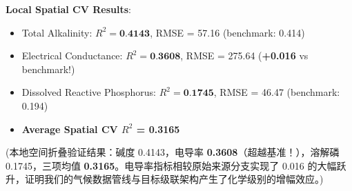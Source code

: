 \begin{infobox}
\textbf{Local Spatial CV Results}:
\begin{itemize}
    \item Total Alkalinity: $R^2 = \textbf{0.4143}$, RMSE = 57.16 (benchmark: 0.414)
    \item Electrical Conductance: $R^2 = \textbf{0.3608}$, RMSE = 275.64 (\textbf{+0.016} vs benchmark!)
    \item Dissolved Reactive Phosphorus: $R^2 = \textbf{0.1745}$, RMSE = 46.47 (benchmark: 0.194)
    \item \textbf{Average Spatial CV $R^2$ = 0.3165}
\end{itemize}
(本地空间折叠验证结果：碱度 0.4143，电导率 \textbf{0.3608}（超越基准！），溶解磷 0.1745，三项均值 \textbf{0.3165}。电导率指标相较原始来源分支实现了 0.016 的大幅跃升，证明我们的气候数据管线与目标级联架构产生了化学级别的增幅效应。)
\end{infobox}
